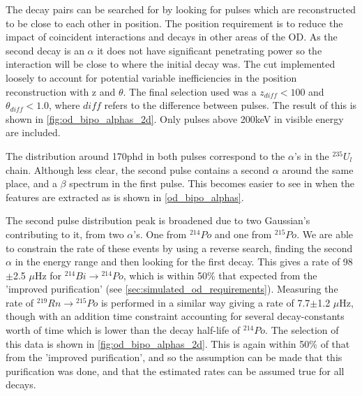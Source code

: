 \par
The decay pairs can be searched for by looking for pulses which are reconstructed to be close to each other in position.
The position requirement is to reduce the impact of coincident interactions and decays in other areas of the OD.
As the second decay is an $\alpha$ it does not have significant penetrating power so the interaction will be close to where the initial decay was.
The cut implemented loosely to account for potential variable inefficiencies in the position reconstruction with z and $\theta$.
The final selection used was a $z_{diff} < 100$ and $\theta_{diff} < 1.0$, where $diff$ refers to the difference between pulses.
The result of this is shown in \autoref{fig:od_bipo_alphas_2d}.
Only pulses above 200keV in visible energy are included.



\par
The distribution around 170phd in both pulses correspond to the $\alpha$'s in the ${}^{235}U_{l}$ chain.
Although less clear, the second pulse contains a second $\alpha$ around the same place, and a $\beta$ spectrum in the first pulse.
This becomes easier to see in when the features are extracted as is shown in \autoref{od_bipo_alphas}.



\par
The second pulse distribution peak is broadened due to two Gaussian's contributing to it, from two $\alpha$'s.
One from ${}^{214}Po$ and one from ${}^{215}Po$.
We are able to constrain the rate of these events by using a reverse search, finding the second $\alpha$ in the energy range and then looking for the first decay.
This gives a rate of 98$\pm$2.5 $\mu$Hz for ${}^{214}Bi \to {}^{214}Po$, which is within 50\% that expected from the 'improved purification' (see \autoref{sec:simulated_od_requirements}).
Measuring the rate of ${}^{219}Rn \to {}^{215}Po$ is performed in a similar way giving a rate of 7.7$\pm$1.2 $\mu$Hz, though with an addition time constraint accounting for several decay-constants worth of time which is lower than the decay half-life of ${}^{214}Po$.
The selection of this data is shown in \autoref{fig:od_bipo_alphas_2d}.
This is again within 50\% of that from the 'improved purification', and so the assumption can be made that this purification was done, and that the estimated rates can be assumed true for all decays.


